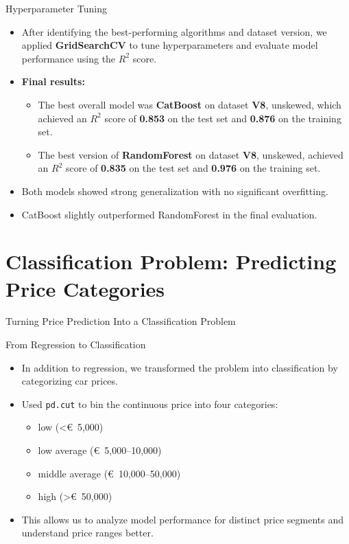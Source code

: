 \documentclass{beamer}
\begin{document}
\begin{frame}{Hyperparameter Tuning}
    \begin{itemize}
        \item After identifying the best-performing algorithms and dataset version, we applied \textbf{GridSearchCV} to tune hyperparameters and evaluate model performance using the $R^2$ score.
        \item \textbf{Final results:}
        \begin{itemize}
            \item The best overall model was \textbf{CatBoost} on dataset \textbf{V8}, unskewed, which achieved an $R^2$ score of \textbf{0.853} on the test set and \textbf{0.876} on the training set.
            \item The best version of \textbf{RandomForest} on dataset \textbf{V8}, unskewed, achieved an $R^2$ score of \textbf{0.835} on the test set and \textbf{0.976} on the training set.
        \end{itemize}
        \item Both models showed strong generalization with no significant overfitting.
        \item CatBoost slightly outperformed RandomForest in the final evaluation.
    \end{itemize}
\end{frame}

\section{Classification Problem: Predicting Price Categories}
\begin{frame}
        \centering
        \Huge
        Turning Price Prediction Into a Classification Problem
\end{frame}


\begin{frame}{From Regression to Classification}
        \begin{itemize}
                \item In addition to regression, we transformed the problem
                        into classification by categorizing car prices.
                \item Used \texttt{pd.cut} to bin the continuous price into
                        four categories:
                        \begin{itemize}
                                \item low (\textless €~5,000)
                                \item low average (€~5,000–10,000)
                                \item middle average (€~10,000–50,000)
                                \item high (\textgreater €~50,000)
                        \end{itemize}
                \item This allows us to analyze model performance for distinct
                        price segments and understand price ranges better.
        \end{itemize}
\end{frame}
\end{document}
